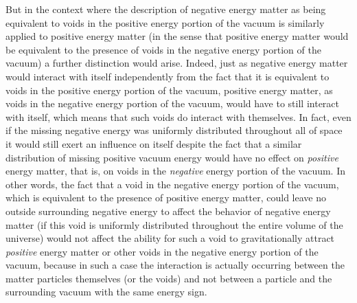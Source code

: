 \documentclass[notitlepage,12pt]{report}
\begin{document}
But in the context where the description of negative energy matter as being equivalent to voids in the positive energy portion of the vacuum is similarly applied to positive energy matter (in the sense that positive energy matter would be equivalent to the presence of voids in the negative energy portion of the vacuum) a further distinction would arise. Indeed, just as negative energy matter would interact with itself independently from the fact that it is equivalent to voids in the positive energy portion of the vacuum, positive energy matter, as voids in the negative energy portion of the vacuum, would have to still interact with itself, which means that such voids do interact with themselves. In fact, even if the missing negative energy was uniformly distributed throughout all of space it would still exert an influence on itself despite the fact that a similar distribution of missing positive vacuum energy would have no effect on \textit{positive} energy matter, that is, on voids in the \textit{negative} energy portion of the vacuum. In other words, the fact that a void in the negative energy portion of the vacuum, which is equivalent to the presence of positive energy matter, could leave no outside surrounding negative energy to affect the behavior of negative energy matter (if this void is uniformly distributed throughout the entire volume of the universe) would not affect the ability for such a void to gravitationally attract \textit{positive} energy matter or other voids in the negative energy portion of the vacuum, because in such a case the interaction is actually occurring between the matter particles themselves (or the voids) and not between a particle and the surrounding vacuum with the same energy sign.

\bigskip
\end{document}
